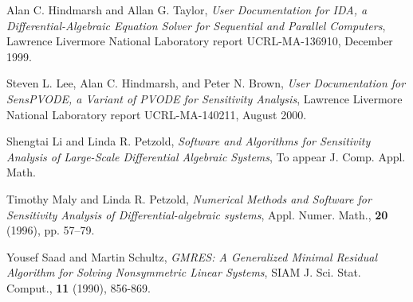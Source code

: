\begin{thebibliography}{99}
 Alan C. Hindmarsh and Allan G. Taylor, {\it User
Documentation for IDA, a Differential-Algebraic Equation Solver for
Sequential and Parallel Computers},
Lawrence Livermore National Laboratory report UCRL-MA-136910, December 1999.

 Steven L. Lee, Alan C. Hindmarsh, and Peter N. Brown,
{\it User Documentation for SensPVODE, a Variant of PVODE for
Sensitivity Analysis}, Lawrence Livermore National Laboratory report
UCRL-MA-140211, August 2000.

Shengtai Li and Linda R. Petzold, {\em Software and Algorithms for Sensitivity
Analysis of Large-Scale Differential Algebraic Systems}, To appear
J. Comp. Appl. Math.

  Timothy Maly and Linda R. Petzold, {\em Numerical Methods and
Software for Sensitivity Analysis of Differential-algebraic systems},
Appl. Numer. Math., {\bf 20} (1996), pp. 57--79.

  Yousef Saad and Martin Schultz, {\em GMRES: A Generalized
Minimal Residual Algorithm for Solving Nonsymmetric Linear Systems},
SIAM J. Sci. Stat. Comput., {\bf 11} (1990), 856-869.

\end{thebibliography}

\newpage

